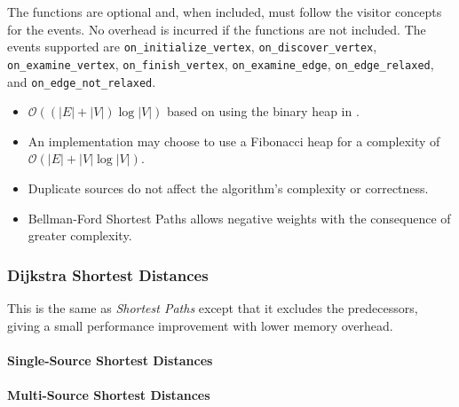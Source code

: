 \begin{itemdescr}
\begin{itemize}
                        The functions are optional and, when included, must follow the visitor concepts for the events.
                        No overhead is incurred if the functions are not included.
                        The events supported are \lstinline{on_initialize_vertex}, \lstinline{on_discover_vertex},
                        \lstinline{on_examine_vertex}, \lstinline{on_finish_vertex}, \lstinline{on_examine_edge},
                        \lstinline{on_edge_relaxed}, and \lstinline{on_edge_not_relaxed}.
            \end{itemize}
      \pnum\complexity
            \begin{itemize}
                  \item $\mathcal{O}((|E| + |V|)\log{|V|})$ based on using the binary heap in .
                  \item An implementation may choose to use a Fibonacci heap for a complexity of $\mathcal{O}(|E| + |V|\log{|V|})$.
            \end{itemize}
      \pnum\remarks 
            \begin{itemize}
                  \item Duplicate sources do not affect the algorithm's complexity or correctness.
                  \item Bellman-Ford Shortest Paths allows negative weights with the consequence of greater complexity.
            \end{itemize}
\end{itemdescr}

\subsubsection{Dijkstra Shortest Distances}
This is the same as \textit{Shortest Paths} except that it excludes the predecessors,
giving a small performance improvement with lower memory overhead.

\paragraph{Single-Source Shortest Distances}
{\small
      
}

\paragraph{Multi-Source Shortest Distances}
{\small
      
}


